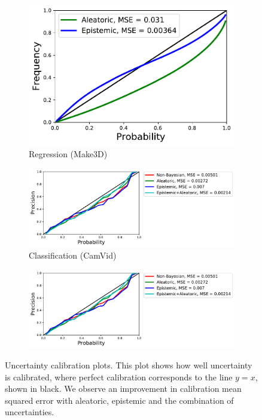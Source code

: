 \begin{figure}[t]
\centering
    \begin{subfigure}[t]{0.33\linewidth}
        \centering
       \includegraphics[width=\linewidth]{calibration_plots_regression}
        \caption{Regression (Make3D)}
    \end{subfigure}
    \begin{subfigure}[t]{0.3\linewidth}
        \centering
       \includegraphics[width=\linewidth, trim=10mm 0mm 115mm 0mm, clip]{calibration_plots}
        \caption{Classification (CamVid)}
    \end{subfigure}
    \begin{subfigure}[t]{0.32\linewidth}
        \centering
       \includegraphics[width=\linewidth, trim=140mm 15mm 0mm 0mm, clip]{calibration_plots}
    \end{subfigure}
\caption[Uncertainty calibration plots.]{Uncertainty calibration plots. This plot shows how well uncertainty is calibrated, where perfect calibration corresponds to the line $y=x$, shown in black. We observe an improvement in calibration mean squared error with aleatoric, epistemic and the combination of uncertainties.}
\label{fig:calibrationplot}
\end{figure}


